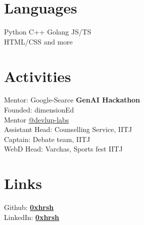 \documentclass[]{deedy-resume-openfont}
\begin{document}
\begin{minipage}[t]{0.33\textwidth}
\sectionsep
\section{Languages}
\textbullet{} Python \textbullet{} C++ \textbullet{} Golang \textbullet{} JS/TS
\\\textbullet{} HTML/CSS \textbullet{} and more


\sectionsep
\section{Activities} 
\textbullet{} Mentor: Google-Searce \textbf{GenAI Hackathon} \\
\textbullet{} Founded: dimensionEd \\
\textbullet{} Mentor \href{https://github.com/devlup-labs}{@devlup-labs \faExternalLink} \\
\textbullet{} Assistant Head: Counselling Service, IITJ\\
\textbullet{} Captain: Debate team, IITJ\\
\textbullet{} WebD Head: Varchas, Sports fest IITJ

\sectionsep
\section{Links} 
Github: \href{https://github.com/0xhrsh}{\bf 0xhrsh \faExternalLink} \\
LinkedIn:  \href{https://www.linkedin.com/in/0xhrsh/}{\bf 0xhrsh \faExternalLink} \\



%
%

\end{minipage} 
\hfill
\end{document}
